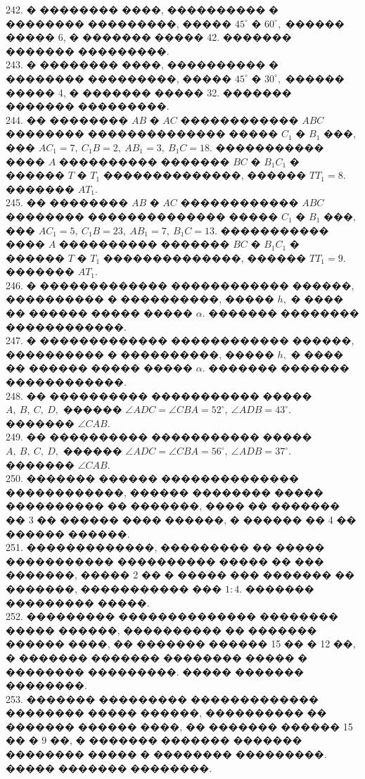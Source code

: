\documentclass[12pt]{article}
\begin{document}
242. � �������� ����, ���������� � �������� ���������, ����� $45^\circ$ � $60^\circ,$ ������ ����� 6, � ������� ����� 42. ������� ������� ���������.\\
243. � �������� ����, ���������� � �������� ���������, ����� $45^\circ$ � $30^\circ,$ ������ ����� 4, � ������� ����� 32. ������� ������� ���������.\\
244. �� �������� $AB$ � $AC$ ������������ $ABC$ �������� �������������� ����� $C_1$ � $B_1$ ���, ��� $AC_1=7,\
C_1B=2,\ AB_1=3,\ B_1C=18.$ ����������� ���� $A$ ���������� ������� $BC$ � $B_1C_1$ � ������ $T$ � $T_1$ ��������������, ������
$TT_1=8.$ ������� $AT_1.$\\
245. �� �������� $AB$ � $AC$ ������������ $ABC$ �������� �������������� ����� $C_1$ � $B_1$ ���, ��� $AC_1=5,\
C_1B=23,\ AB_1=7,\ B_1C=13.$ ����������� ���� $A$ ���������� ������� $BC$ � $B_1C_1$ � ������ $T$ � $T_1$ ��������������, ������
$TT_1=9.$ ������� $AT_1.$\\
246. � ������������� ������������ ������, ���������� � ����������, ����� $h,$ � ���� �� ������
����� ����� $\alpha.$ ������� �������� ������������.\\
247. � ������������� ������������ ������, ���������� � ����������, ����� $h,$ � ���� �� ������
����� ����� $\alpha.$ ������� ������� ������������.\\
248. �� ���������� ����������� ����� $A,\ B,\ C,\ D,$ ������ $\angle ADC=\angle CBA=52^\circ,\
\angle ADB=43^\circ.$ ������� $\angle CAB.$\\
249. �� ���������� ����������� ����� $A,\ B,\ C,\ D,$ ������ $\angle ADC=\angle CBA=56^\circ,\
\angle ADB=37^\circ.$ ������� $\angle CAB.$\\
250. ������� ������ �������������� ������������, ������
�������� ����� ���������� �� �������, ���� �� �������
�� 3 �� ������ ���� ������, � ������ �� 4 �� ������
������.\\
251. �������������, ��������� �� ����� �����������
���������� ����� �� ��� �������, ����� 2 �� � ����� ���
������� �� �������, ����������� ��� $1:4.$ �������
��������� �����.\\
252. ��������� �������������� �������� ����� ������,
���������� �� ������� ������ ����, �� ������� ������
15 �� � 12 ��, � ������� ������� �������� ����� �
�������� ���������. ����� ������� ��������.\\
253. ������� ��������� ������������� �������� �����
������, ���������� �� ������� ������ ����, �� �������
������ 15 �� � 9 ��, � ������� ������� ������� ��������
����� � �������� ���������. ����� �������
��������.
\newpage
\end{document}
